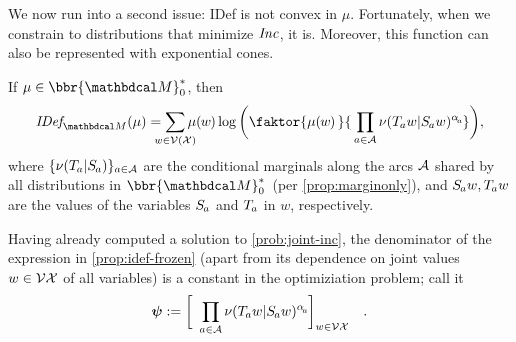 \documentclass[twoside]{article}
\begin{document}
We now run into a second issue: IDef is not convex in $\mu$. 
Fortunately, when we constrain to distributions
that minimize $\mathit{Inc}$, 
it is.
Moreover, this function can also be represented with exponential cones.

\begin{prop}\label{prop:idef-frozen}
If $\mu \in \bbr{\dg M}_0^*$, 
then
\vspace{-1ex}
\[
    \IDef{\dg M}(\mu) = 
        \sum_{\mathclap{ w \in \V(\X)} }
            \mu(\mskip-1mu w \mskip-1mu)
            \log  \bigg(
                \faktor{\mu(\mskip-1mu w\mskip-1mu )\,}{\,\prod_{a \in \Ar} \nu(\Tgt aw | \Src aw)^
                {\alpha\ssub a}
                }
            \bigg)
        ,
\]
%
where $\{ \nu(\Tgt a | \Src a ) \}_{a \in \Ar}$ are the
conditional marginals along the arcs $\mathcal A$ 
shared by all distributions in $\bbr{\dg M}^*_0$\
(per \cref{prop:marginonly}),
and $\Src a w, \Tgt a w$ are the values of the variables
$\Src a$ and $\Tgt a$
in $w$,
respectively.
\end{prop}

Having already computed a solution to \eqref{prob:joint-inc},
the denominator of the expression in \cref{prop:idef-frozen}
(apart from its dependence on joint values $w \in \mathcal V\mathcal X$ of all variables)
is a constant in the optimiziation problem; call it
\begin{equation}
    \boldsymbol\psi := \bigg[~\prod_{a \in \Ar} \nu(\Tgt a w | \Src a w)^{\alpha\ssub a} \bigg]_{w \in \V\X}\quad.
    \label{eq:cm-product}
\end{equation}
\end{document}
